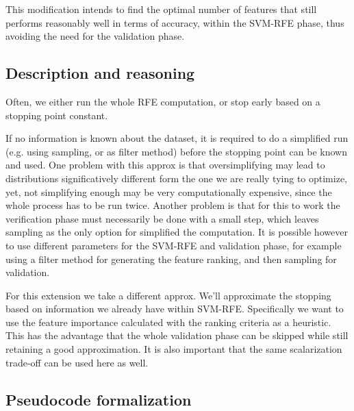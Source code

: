 This modification intends to find the optimal number of features that still performs reasonably well in terms of accuracy, within the SVM-RFE phase, thus avoiding the need for the validation phase. 

\subsection{Description and reasoning}
\label{sec:ch5.stopcond.desc}

Often, we either run the whole RFE computation, or stop early based on a stopping point constant. 

If no information is known about the dataset, it is required to do a simplified run (e.g. using sampling, or as filter method) before the stopping point can be known and used. One problem with this approx is that oversimplifying may lead to distributions significatively different form the one we are really tying to optimize, yet, not simplifying enough may be very computationally expensive, since the whole process has to be run twice. Another problem is that for this to work the verification phase must necessarily be done with a small step, which leaves sampling as the only option for simplified the computation. It is possible however to use different parameters for the SVM-RFE and validation phase, for example using a filter method for generating the feature ranking, and then sampling for validation.

For this extension we take a different approx. We'll approximate the stopping based on information we already have within SVM-RFE. Specifically we want to use the feature importance calculated with the ranking criteria as a heuristic. This has the advantage that the whole validation phase can be skipped while still retaining a good approximation. It is also important that the same scalarization trade-off can be used here as well.

\subsection{Pseudocode formalization}

